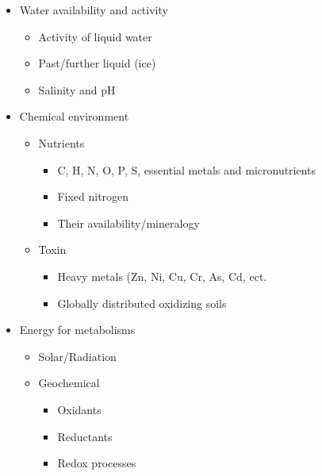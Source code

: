 \begin{itemize}
   \item  Water availability and activity
   \begin{itemize}
     \item  Activity of liquid water
     \item Past/further liquid (ice)
     \item Salinity and pH
    \end{itemize}
   \end{itemize}
   
     \begin{itemize}
       \item  Chemical environment
       
       \begin{itemize}
         \item Nutrients 
         
         \begin{itemize}
          \item C, H, N, O, P, S, essential metals and micronutrients
          \item Fixed nitrogen
          \item Their availability/mineralogy
         \end{itemize}
          
         \item Toxin
          \begin{itemize}
           \item Heavy metals (Zn, Ni, Cu, Cr, As, Cd, ect.
           \item Globally distributed oxidizing soils
          \end{itemize}
          
       \end{itemize}
     \end{itemize}
     
     \begin{itemize}
       \item  Energy for metabolisms 
       
       \begin{itemize}
         \item Solar/Radiation 
         \item Geochemical
         
         \begin{itemize}
          \item Oxidants
          \item Reductants
          \item Redox processes
         \end{itemize}
          
       \end{itemize}
     \end{itemize}
     
